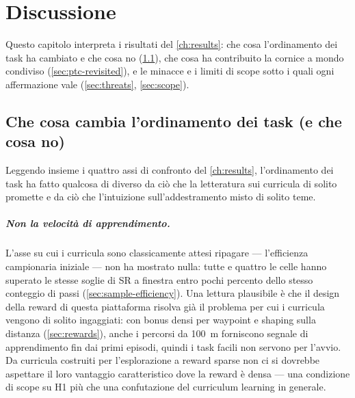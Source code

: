 \chapter{Discussione}
\label{ch:discussion}

Questo capitolo interpreta i risultati del \cref{ch:results}: che cosa
l'ordinamento dei task ha cambiato e che cosa no (\cref{sec:ordering}),
che cosa ha contribuito la cornice a mondo condiviso
(\cref{sec:ptc-revisited}), e le minacce e i limiti di scope sotto i
quali ogni affermazione vale (\cref{sec:threats}, \cref{sec:scope}).

\section{Che cosa cambia l'ordinamento dei task (e che cosa no)}
\label{sec:ordering}

Leggendo insieme i quattro assi di confronto del \cref{ch:results},
l'ordinamento dei task ha fatto qualcosa di diverso da ciò che la
letteratura sui curricula di solito promette e da ciò che l'intuizione
sull'addestramento misto di solito teme.

\paragraph{Non la velocità di apprendimento.}
L'asse su cui i curricula sono classicamente attesi ripagare ---
l'efficienza campionaria iniziale --- non ha mostrato nulla: tutte e
quattro le celle hanno superato le stesse soglie di SR a finestra entro
pochi percento dello stesso conteggio di passi
(\cref{sec:sample-efficiency}). Una lettura plausibile è che il design
della reward di questa piattaforma risolva già il problema per cui i
curricula vengono di solito ingaggiati: con bonus densi per waypoint e
shaping sulla distanza (\cref{sec:rewards}), anche i percorsi da
\SI{100}{m} forniscono segnale di apprendimento fin dai primi episodi,
quindi i task facili non servono per l'avvio. Da curricula costruiti
per l'esplorazione a reward sparse non ci si dovrebbe aspettare il loro
vantaggio caratteristico dove la reward è densa --- una condizione di
scope su H1 più che una confutazione del curriculum learning in
generale.

